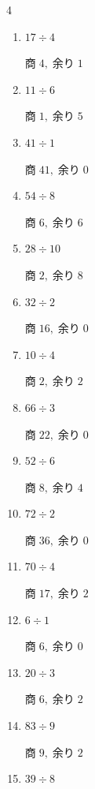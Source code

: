 \begin{multicols}{4}
\begin{enumerate}
        $商\; 18,\; 余り\; 2$

  \item $17 \div 4$

        $商\; 4,\; 余り\; 1$

  \item $11 \div 6$

        $商\; 1,\; 余り\; 5$

  \item $41 \div 1$

        $商\; 41,\; 余り\; 0$

  \item $54 \div 8$

        $商\; 6,\; 余り\; 6$

  \item $28 \div 10$

        $商\; 2,\; 余り\; 8$

  \item $32 \div 2$

        $商\; 16,\; 余り\; 0$

  \item $10 \div 4$

        $商\; 2,\; 余り\; 2$

  \item $66 \div 3$

        $商\; 22,\; 余り\; 0$

  \item $52 \div 6$

        $商\; 8,\; 余り\; 4$

  \item $72 \div 2$

        $商\; 36,\; 余り\; 0$

  \item $70 \div 4$

        $商\; 17,\; 余り\; 2$

  \item $6 \div 1$

        $商\; 6,\; 余り\; 0$

\columnbreak %

\resetques

  \item $20 \div 3$

        $商\; 6,\; 余り\; 2$

  \item $83 \div 9$

        $商\; 9,\; 余り\; 2$

  \item $39 \div 8$


\end{enumerate}
\end{multicols}
